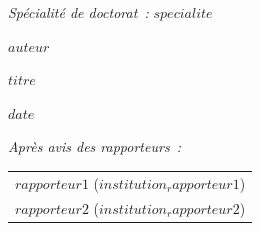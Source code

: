 \documentclass[a4paper,12pt]{reedthesis}
\begin{document}
\begin{center}
{\it Spécialité de doctorat~:} {\large $specialite$}
\end{center}

\vspace{5mm}

\begin{center}
{\large\bf $auteur$}
\end{center}

\vspace{3mm}

\begin{center}
{\Large $titre$}
\end{center}


\vspace{10mm}

 $date$

\vspace{5mm}

\noindent
{\small \it Après avis des rapporteurs~:}
\begin{tabular}{l}
{\sc $rapporteur1$} ($institution_rapporteur1$)\vspace{1mm}  \\
{\sc $rapporteur2$} ($institution_rapporteur2$)\\
\end{tabular}

\vspace{8mm}
\end{document}
